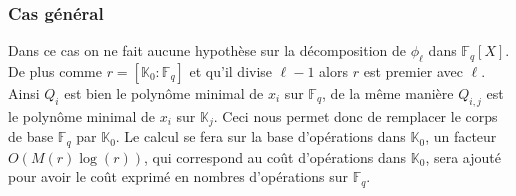 \documentclass[10pt,a4paper]{book}
\theoremstyle{plain}
\theoremstyle{definition}
\theoremstyle{definition}
\theoremstyle{definition}
\newtheorem{prop}[thm]{Proposition}
\theoremstyle{definition}
\theoremstyle{remark}
\theoremstyle{remark}
\theoremstyle{definition}
\begin{document}
%

\subsubsection{Cas général}
Dans ce cas on ne fait aucune hypothèse sur la décomposition de $\phi_{\ell}$ dans $\mathbb{F}_q[X]$. De plus comme $r=[\mathbb{K}_0:\mathbb{F}_q]$ et qu'il divise $\ell-1$ alors $r$ est premier avec $\ell$. Ainsi $Q_i$ est bien le polynôme minimal de $x_i$ sur $\mathbb{F}_q$, de la même manière $Q_{i,j}$ est le polynôme minimal de $x_i$ sur $\mathbb{K}_j$. Ceci nous permet donc de remplacer le corps de base $\mathbb{F}_q$ par $\mathbb{K}_0$. Le calcul se fera sur la base d'opérations dans $\mathbb{K}_0$, un facteur $O(M(r)\log(r))$, qui correspond au coût d'opérations dans $\mathbb{K}_0$, sera ajouté pour avoir le coût exprimé en nombres d'opérations sur $\mathbb{F}_q$.
\end{document}
